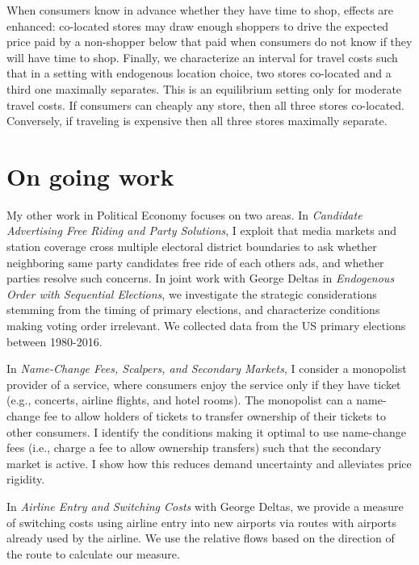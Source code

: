\documentclass[12pt]{article}
\begin{document}
When consumers know in advance whether they have time to shop, effects are enhanced: co-located stores may draw enough shoppers to drive the expected price paid by
a non-shopper below that paid when consumers do not know if they will have time to shop.
Finally, we characterize an interval for travel costs such that in a setting with endogenous location choice, two stores co-located and a third one maximally separates.
This is an equilibrium setting only for moderate travel costs.
If consumers can cheaply any store, then all three stores co-located. Conversely, if traveling is expensive then all three stores maximally separate.

\vspace{0.25cm}
\section{On going work}
\label{sec:org087cc56}
\vspace{0.1cm}

My other work in Political Economy focuses on two areas. In \emph{Candidate Advertising Free Riding and Party Solutions},
I exploit that media markets and station coverage cross multiple electoral district boundaries to ask whether neighboring same party candidates free ride of each others ads, and whether parties resolve such concerns.
In joint work with George Deltas in \emph{Endogenous Order with Sequential Elections},  we investigate the strategic considerations stemming from the timing of primary elections, and characterize conditions making voting order irrelevant.
We collected data from the US primary elections between 1980-2016.



In \emph{Name-Change Fees, Scalpers, and Secondary Markets}, I consider a monopolist provider of a service, where consumers enjoy the service only if they have ticket (e.g., concerts, airline flights, and hotel rooms).
The monopolist can a name-change fee to allow holders of tickets to transfer ownership of their tickets to other consumers.
I identify the conditions making it optimal to use name-change fees (i.e., charge a fee to allow ownership transfers) such that the secondary market is active. I show how this reduces demand uncertainty and alleviates price rigidity.

In \emph{Airline Entry and Switching Costs} with George Deltas, we provide a measure of switching costs using airline entry into new airports via routes with airports already used by the airline. We use the relative flows based on the direction of the route to calculate our measure.
\end{document}
